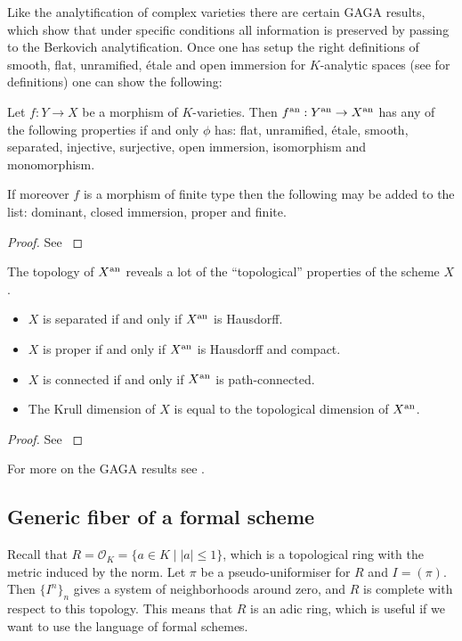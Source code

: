 Like the analytification of complex varieties there are certain GAGA results, which show that under specific conditions all information is preserved by passing to the Berkovich analytification. 
Once one has setup the right definitions of smooth, flat, unramified, étale and open immersion for $K$-analytic spaces (see \cite[][sec. 3.1]{berkovichSpectralTheoryAnalytic2012} for definitions) one can show the following:
\begin{theorem}
	Let $f: Y \to X$  be a morphism of $K$-varieties. Then $f{}^{\text{an}}: Y {}^{\text{an}} \to X{}^{\text{an}}$ has any of the following properties if and only $\phi$ has: flat, unramified, étale, smooth, separated, injective, surjective, open immersion, isomorphism and monomorphism. 

	If moreover $f$ is a morphism of finite type then the following may be added to the list: dominant, closed immersion, proper and finite. 
\end{theorem}
\begin{proof}
	See \cite[][prop.\ 3.4.6 and prop.\ 3.4.7]{berkovichSpectralTheoryAnalytic2012}
\end{proof}

\begin{theorem}
	The topology of $X{}^{\text{an}}$ reveals a lot of the ``topological'' properties of the scheme $X$. 
	\begin{itemize}
		\item $X$ is separated if and only if $X{}^{\text{an}}$ is Hausdorff. 
		\item $X$ is proper if and only if $X{}^{\text{an}}$ is Hausdorff and compact. 
		\item  $X$ is connected if and only if $X{}^{\text{an}}$ is path-connected. 
		\item The Krull dimension of  $X$ is equal to the topological dimension of $X{}^{\text{an}}$. 
	\end{itemize}
\end{theorem}
\begin{proof}
	See \cite[][thm.\ 3.4.8]{berkovichSpectralTheoryAnalytic2012}
\end{proof}

For more on the GAGA results see \cite[][sec.\ 3.4]{berkovichSpectralTheoryAnalytic2012}.

\subsection{Generic fiber of a formal scheme} \label{sec:generic_fiber_of_a_formal_scheme}

Recall that $R = \mathcal{O}_K = \{a \in K \mid |a| \le 1\} $, which is a topological ring with the metric induced by the norm. 
Let $\pi$ be a pseudo-uniformiser for $R$ and $I = (\pi)$. 
Then $\{I^{n}\}_n$ gives a system of neighborhoods around zero, and $R$ is complete with respect to this topology. 
This means that $R$ is an adic ring, which is useful if we want to use the language of formal schemes. 

